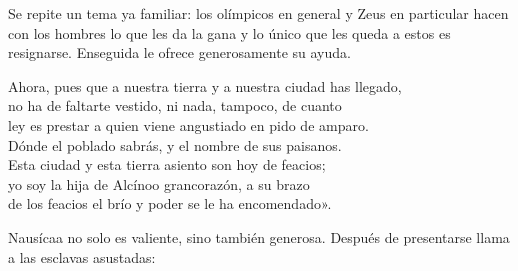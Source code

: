 Se repite un tema ya familiar: los olímpicos en general y Zeus en particular hacen con los hombres lo que les da la gana y lo único que les queda a estos es resignarse. Enseguida le ofrece generosamente su ayuda.

\begin{versocita}
Ahora, pues que a nuestra tierra y a nuestra ciudad has llegado,\\
no ha de faltarte vestido, ni nada, tampoco, de cuanto\\
ley es prestar a quien viene angustiado en pido de amparo.\\
Dónde el poblado sabrás, y el nombre de sus paisanos.\\
Esta ciudad y esta tierra asiento son hoy de feacios;\\
yo soy la hija de Alcínoo grancorazón, a su brazo\\
de los feacios el brío y poder se le ha encomendado».
\end{versocita}

%

Nausícaa no solo es valiente, sino también generosa. Después de presentarse llama a las esclavas asustadas:

